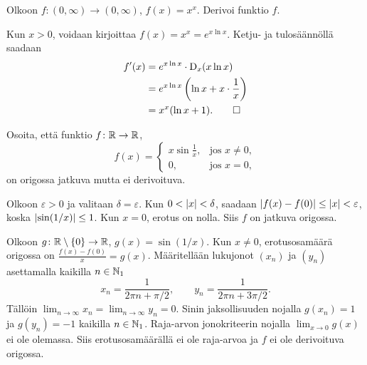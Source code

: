 \documentclass[11pt,a4paper]{amsart}
\theoremstyle{definition}
\begin{document}
\begin{exercise}
  Olkoon \(f \colon (0, \infty) \to (0, \infty)\), \(f(x) = x^x\).\newline
  Derivoi funktio \(f\).
\end{exercise}

\begin{solution}
  Kun \(x > 0\), voidaan kirjoittaa \(f(x) = x^x = e^{x\ln x}\).
  Ketju- ja tulosäännöllä saadaan
  \begin{align*}
    f'(x) &= e^{x\ln x} \cdot \operatorname{D}_{x}(x\ln x) \\
    &= e^{x\ln x} \left(\ln x + x \cdot \frac{1}{x}\right) \\
    &= x^x(\ln x + 1). \qedhere
  \end{align*}
\end{solution}

\begin{exercise}
  Osoita, että funktio \(f \colon \mathbb{R} \to \mathbb{R}\),
  \[
    f(x) =
    \begin{cases}
      x\sin\frac{1}{x}, & \text{jos } x \neq 0, \\
      0, & \text{jos } x = 0,
    \end{cases}
  \]
  on origossa jatkuva mutta ei derivoituva.
\end{exercise}

\begin{solution}
  Olkoon \(\varepsilon > 0\) ja valitaan \(\delta = \varepsilon\).
  Kun \(0 < \lvert x\rvert < \delta\), saadaan \(\lvert f(x) - f(0)\rvert \leq \lvert x\rvert
  < \varepsilon\), koska \(\lvert\sin(1/x)\rvert \leq 1\).
  Kun \(x = 0\), erotus on nolla. Siis \(f\) on jatkuva origossa.

  Olkoon \(g \colon \mathbb{R} \setminus \left\lbrace0\right\rbrace \to \mathbb{R}\), \(g(x) = \sin(1/x)\).
  Kun \(x \neq 0\), erotusosamäärä origossa on \(\frac{f(x)-f(0)}{x} = g(x)\).
  Määritellään lukujonot \((x_n)\) ja \((y_n)\) asettamalla kaikilla
  \(n \in \mathbb{N}_1\)
  \[
    x_n = \frac{1}{2\pi n + \pi/2}, \qquad
    y_n = \frac{1}{2\pi n + 3\pi/2}.
  \]
  Tällöin \(\lim_{n \to \infty} x_n = \lim_{n \to \infty} y_n = 0\).
  Sinin jaksollisuuden nojalla \(g(x_n) = 1\) ja \(g(y_n) = -1\) kaikilla
  \(n \in \mathbb{N}_1\). Raja-arvon jonokriteerin nojalla \(\lim_{x \to 0} g(x)\)
  ei ole olemassa. Siis erotusosamäärällä ei ole raja-arvoa ja \(f\) ei ole
  derivoituva origossa.
\end{solution}
\end{document}
